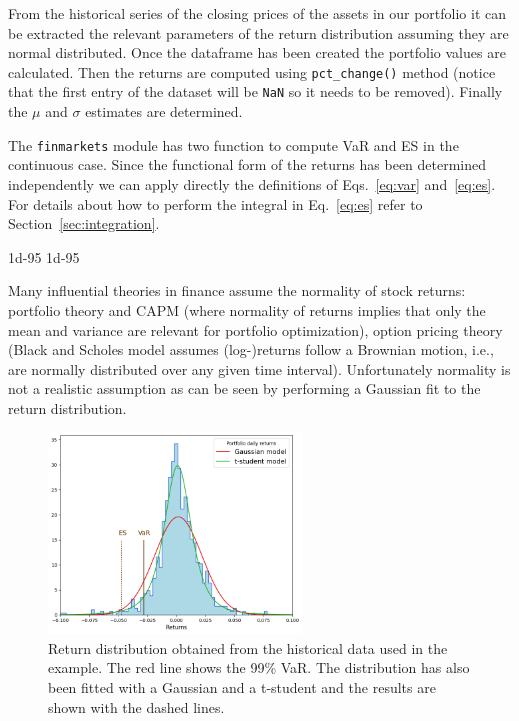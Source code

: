 From the historical series of the closing prices of the assets in our portfolio it can be extracted the relevant parameters of the return distribution assuming they are normal distributed.
Once the dataframe has been created the portfolio values are calculated. Then the returns are computed using \texttt{pct\_change()} method (notice that the first entry of the dataset will be \texttt{NaN} so it needs to be removed).
Finally the $\mu$ and $\sigma$ estimates are determined.

\begin{finmarkets}
The \texttt{finmarkets} module has two function to compute VaR and ES in the continuous case.
Since the functional form of the returns has been determined independently we can apply directly the definitions of  Eqs.~\ref{eq:var} and~\ref{eq:es}. 
For details about how to perform the integral in Eq.~\ref{eq:es} refer to Section~\ref{sec:integration}.
\end{finmarkets}


\begin{ioutput}
1d-95%
1d-95%
\end{ioutput}

Many influential theories in finance assume the normality of stock returns: portfolio theory and CAPM (where normality of returns implies that only the mean and variance are relevant for portfolio optimization), option pricing theory (Black and Scholes model assumes (log-)returns follow a Brownian motion, i.e., are normally distributed over any given time interval).
Unfortunately normality is not a realistic assumption as can be seen by performing a Gaussian fit to the return distribution.

\begin{figure}[htb]
\centering
\includegraphics[width=0.6\textwidth]{figures/parametric_var}
\caption{Return distribution obtained from the historical data used in the example. The red line shows the 99\% VaR. The distribution has also been fitted with a Gaussian and a t-student and the results are shown with the dashed lines.}
\label{fig:paramtric_var}
\end{figure}

